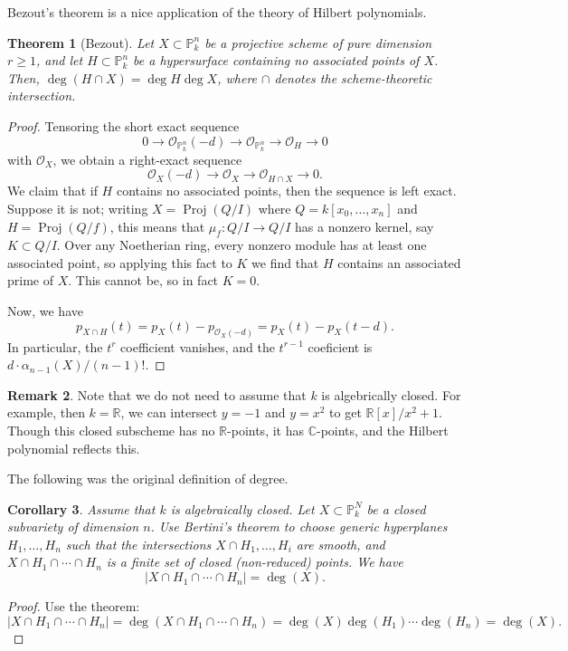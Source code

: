 \documentclass[10pt]{article}
\newtheorem{thm}{Theorem}[section]
\newtheorem{cor}[thm]{Corollary}
\theoremstyle{definition}
\newtheorem{rmk}[thm]{Remark}
\DeclareMathOperator{\Proj}{Proj}
\newcommand{\PP}{\mathbb{P}}
\newcommand{\C}{\mathbb{C}}
\newcommand{\R}{\mathbb{R}}
\newcommand{\OO}{\mathcal{O}}
\begin{document}
Bezout's theorem is a nice application of the theory of Hilbert polynomials.
\begin{thm}[Bezout]
Let $X \subset \PP^n_k$ be a projective scheme of pure dimension $r \geq 1$, and let $H \subset \PP^n_k$ be a hypersurface containing no associated points of $X$.  Then, $\deg(H \cap X) = \deg H \deg X$, where $\cap$ denotes the scheme-theoretic intersection.
\end{thm}
\begin{proof}
Tensoring the short exact sequence
$$0 \rightarrow \OO_{\PP^n_k}(-d) \rightarrow \OO_{\PP^n_k} \rightarrow \OO_H \rightarrow 0$$
with $\OO_X$, we obtain a right-exact sequence
$$\OO_{X}(-d) \rightarrow \OO_{X} \rightarrow \OO_{H \cap X} \rightarrow 0.$$
We claim that if $H$ contains no associated points, then the sequence is left exact.  Suppose it is not; writing $X = \Proj(Q/I)$ where $Q = k[x_0, \ldots, x_n]$ and $H = \Proj(Q/f)$, this means that $\mu_f: Q/I \rightarrow Q/I$ has a nonzero kernel, say $K \subset Q/I$.  Over any Noetherian ring, every nonzero module has at least one associated point, so applying this fact to $K$ we find that $H$ contains an associated prime of $X$.  This cannot be, so in fact $K = 0$.

Now, we have
$$p_{X \cap H}(t) = p_X(t) - p_{\OO_X(-d)} = p_X(t) - p_X(t-d).$$
In particular, the $t^r$ coefficient vanishes, and the $t^{r-1}$ coeficient is $d \cdot \alpha_{n-1}(X)/(n-1)!$.
\end{proof}

\begin{rmk}
Note that we do not need to assume that $k$ is algebrically closed.  For example, then $k = \R$, we can intersect $y = -1$ and $y = x^2$ to get $\R[x]/x^2 + 1$.  Though this closed subscheme has no $\R$-points, it has $\C$-points, and the Hilbert polynomial reflects this.
\end{rmk}

The following was the original definition of degree.
\begin{cor}
Assume that $k$ is algebraically closed.  Let $X \subset \PP^N_k$ be a closed subvariety of dimension $n$.  Use Bertini's theorem to choose generic hyperplanes $H_1, \ldots, H_n$ such that the intersections $X \cap H_1, \ldots, H_i$ are smooth, and $X \cap H_1 \cap \cdots \cap H_n$ is a finite set of closed (non-reduced) points.  We have
$$|X \cap H_1 \cap \cdots \cap H_n| = \deg(X).$$
\end{cor}
\begin{proof}
Use the theorem: 
$$|X \cap H_1 \cap \cdots \cap H_n| = \deg(X \cap H_1 \cap \cdots \cap H_n) = \deg(X) \deg(H_1) \cdots \deg(H_n) = \deg(X).$$
\end{proof}
\end{document}
